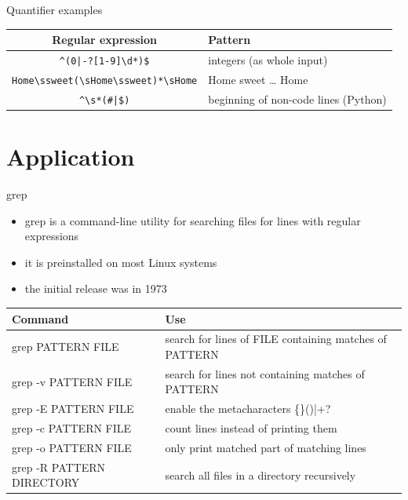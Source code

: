\documentclass[10pt, graphics, aspectratio=169, table]{beamer}
\begin{document}
    \begin{frame}[fragile]{Quantifier examples}
        \begin{center}
            \renewcommand{\arraystretch}{1.5}
            \begin{tabular}{cl}
                \toprule
                Regular expression & Pattern \\
                \midrule
                \verb!^(0|-?[1-9]\d*)$! & integers (as whole input) \\
                \verb!Home\ssweet(\sHome\ssweet)*\sHome! & Home sweet \ldots{} Home \\
                \verb!^\s*(#|$)! & beginning of non-code lines (Python) \\
                \bottomrule
            \end{tabular}
        \end{center}
    \end{frame}


    \section{Application}
    \begin{frame}{grep}
        \begin{itemize}
            \item grep is a command-line utility for searching files for lines with regular expressions
            \item it is preinstalled on most Linux systems
            \item the initial release was in 1973
        \end{itemize}
        \begin{center}
            \begin{tabular}{ll}
                \toprule
                Command & Use \\
                \midrule
                grep PATTERN FILE & search for lines of FILE containing matches of PATTERN \\
                grep -v PATTERN FILE & search for lines not containing matches of PATTERN \\
                grep -E PATTERN FILE & enable the metacharacters \{\}()|+? \\
                grep -c PATTERN FILE & count lines instead of printing them \\
                grep -o PATTERN FILE & only print matched part of matching lines \\
                grep -R PATTERN DIRECTORY & search all files in a directory recursively \\
                \bottomrule
            \end{tabular}
        \end{center}
    \end{frame}
\end{document}

